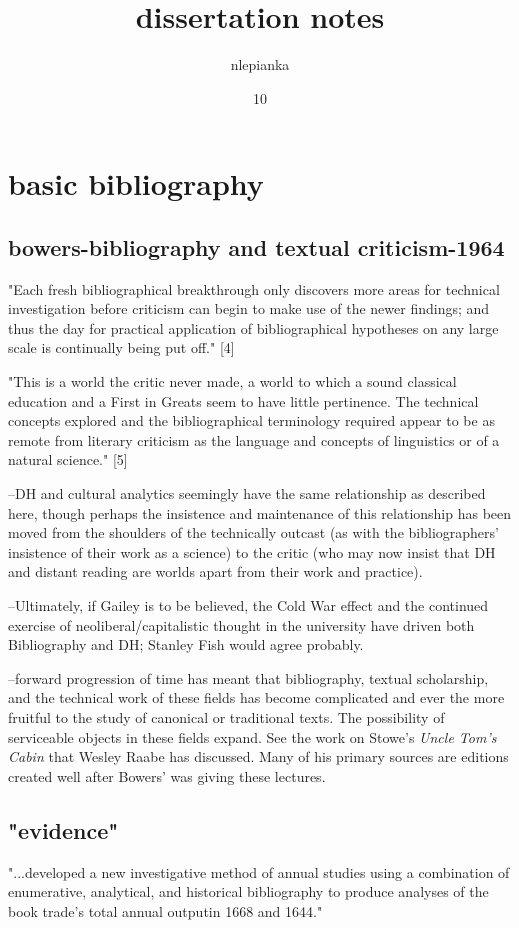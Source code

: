 \documentclass[course, english]{Notes}
\title{dissertation notes}
\author{nlepianka}
\date{10}{12}{2016}
\newcommand{\n}{\scalebox{2}{\textbf{\framebox{$\aleph$}}}}
\begin{document}
\section{basic bibliography}
\subsection{bowers-bibliography and textual criticism-1964}

"Each fresh bibliographical breakthrough only discovers more areas for technical investigation before criticism can begin to make use of the newer findings; and thus the day for practical application of bibliographical hypotheses on any large scale is continually being put off." [4]

"This is a world the critic never made, a world to which a sound classical education and a First in Greats seem to have little pertinence. The technical concepts explored and the bibliographical terminology required appear to be as remote from literary criticism as the language and concepts of linguistics or of a natural science." [5]

\n --DH and cultural analytics seemingly have the same relationship as described here, though perhaps the insistence and maintenance of this relationship has been moved from the shoulders of the technically outcast (as with the bibliographers' insistence of their work as a science) to the critic (who may now insist that DH and distant reading are worlds apart from their work and practice).
	
\n --Ultimately, if Gailey is to be believed, the Cold War effect and the continued exercise of neoliberal/capitalistic thought in the university have driven both Bibliography and DH; Stanley Fish would agree probably.
	
\n --forward progression of time has meant that bibliography, textual scholarship, and the technical work of these fields has become complicated and ever the more fruitful to the study of canonical or traditional texts. The possibility of serviceable objects in these fields expand. See the work on Stowe's \emph{Uncle Tom's Cabin} that Wesley Raabe has discussed. Many of his primary sources are editions created well after Bowers' was giving these lectures.


\subsection{"evidence"}

"...developed a new investigative method of annual studies using a combination of enumerative, analytical, and historical bibliography to produce analyses of the book trade's total annual outputin 1668 and 1644."
\end{document}
